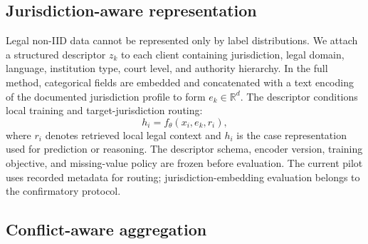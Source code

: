 \documentclass[a4paper,fleqn]{cas-sc}
\begin{document}
\subsection{Jurisdiction-aware representation}

Legal non-IID data cannot be represented only by label distributions. We attach a structured descriptor $z_k$ to each client containing jurisdiction, legal domain, language, institution type, court level, and authority hierarchy. In the full method, categorical fields are embedded and concatenated with a text encoding of the documented jurisdiction profile to form $e_k \in \mathbb{R}^{d}$. The descriptor conditions local training and target-jurisdiction routing:
\begin{equation}
    h_i = f_{\theta}(x_i, e_k, r_i),
\end{equation}
where $r_i$ denotes retrieved local legal context and $h_i$ is the case representation used for prediction or reasoning.
The descriptor schema, encoder version, training objective, and missing-value policy are frozen before evaluation. The current pilot uses recorded metadata for routing; jurisdiction-embedding evaluation belongs to the confirmatory protocol.

\subsection{Conflict-aware aggregation}
\end{document}
